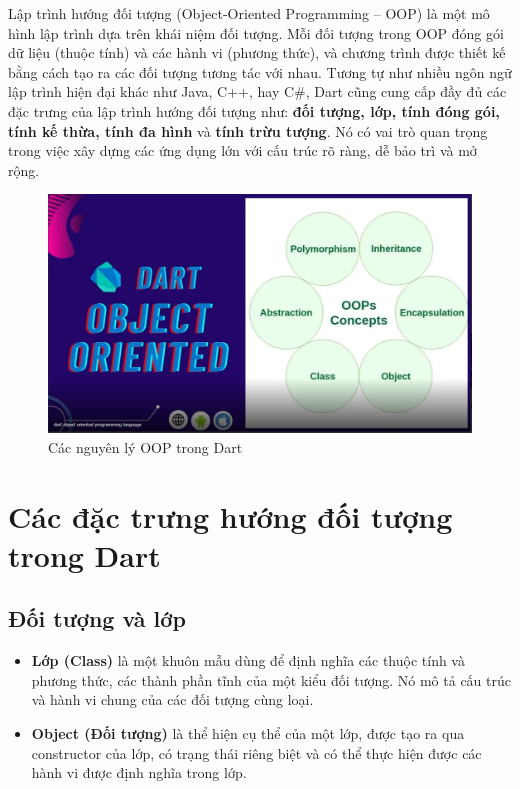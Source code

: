 \documentclass[../DoAn.tex]{subfiles}
\numberwithin{figure}{chapter}
\begin{document}
Lập trình hướng đối tượng (Object-Oriented Programming – OOP) là một mô hình lập trình dựa trên khái niệm đối tượng.  Mỗi đối tượng trong OOP đóng gói dữ liệu (thuộc tính) và các hành vi (phương thức), và chương trình được thiết kế bằng cách tạo ra các đối tượng tương tác với nhau.  Tương tự như nhiều ngôn ngữ lập trình hiện đại khác như Java, C++, hay C\#, Dart cũng cung cấp đầy đủ các đặc trưng của lập trình hướng đối tượng như: \textbf{đối tượng, lớp, tính đóng gói, tính kế thừa, tính đa hình} và \textbf{tính trừu tượng}. Nó có vai trò quan trọng trong việc xây dựng các ứng dụng lớn với cấu trúc rõ ràng, dễ bảo trì và mở rộng.

\begin{figure}[H]
    \centering
    \includegraphics[width=1\textwidth]{Hinhve/oopInDart.png}
    \caption{Các nguyên lý OOP trong Dart}
    \label{fig:oopindart}
\end{figure}

\section{Các đặc trưng hướng đối tượng trong Dart}
\subsection{Đối tượng và lớp}

\begin{itemize}
\item \textbf{Lớp (Class)} là một khuôn mẫu dùng để định nghĩa các thuộc tính và phương thức, các thành phần tĩnh của một kiểu đối tượng. Nó mô tả cấu trúc và hành vi chung của các đối tượng cùng loại.
\item \textbf{Object (Đối tượng)} là thể hiện cụ thể của một lớp, được tạo ra qua constructor của lớp, có trạng thái riêng biệt và có thể thực hiện được các hành vi được định nghĩa trong lớp.
\end{itemize}
\end{document}
